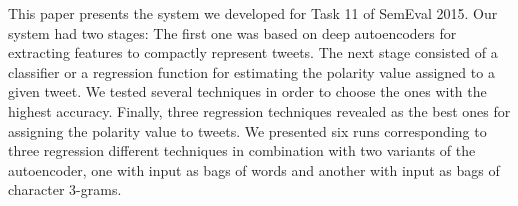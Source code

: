 This paper presents the system we developed for Task 11 of SemEval 2015. Our system had two stages: The first one was based on deep autoencoders for extracting features to compactly represent tweets. The next stage consisted of a classifier or a regression function for estimating the polarity value assigned to a given tweet. We tested several techniques in order to choose the ones with the highest accuracy. Finally, three regression techniques revealed as the best ones for assigning the polarity value to tweets. We presented six runs corresponding to three regression different techniques in combination with two variants of the autoencoder, one with input as bags of words and another with input as bags of character 3-grams.
